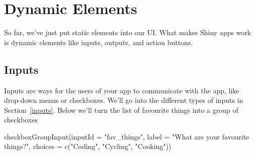 \documentclass[
  oneside]{book}
\newenvironment{Shaded}{\begin{snugshade}}{\end{snugshade}}
\newcommand{\AttributeTok}[1]{\textcolor[rgb]{0.77,0.63,0.00}{#1}}
\newcommand{\FunctionTok}[1]{\textcolor[rgb]{0.00,0.00,0.00}{#1}}
\newcommand{\NormalTok}[1]{#1}
\newcommand{\OtherTok}[1]{\textcolor[rgb]{0.56,0.35,0.01}{#1}}
\newcommand{\SpecialCharTok}[1]{\textcolor[rgb]{0.00,0.00,0.00}{#1}}
\newcommand{\StringTok}[1]{\textcolor[rgb]{0.31,0.60,0.02}{#1}}
\begin{document}
\begin{Shaded}
\end{Shaded}

\hypertarget{dynamic-elements}{%
\section{Dynamic Elements}\label{dynamic-elements}}

So far, we've just put static elements into our UI. What makes Shiny apps work is dynamic elements like inputs, outputs, and action buttons.

\hypertarget{inputs-intro}{%
\subsection{Inputs}\label{inputs-intro}}

Inputs are ways for the users of your app to communicate with the app, like drop-down menus or checkboxes. We'll go into the different types of inputs in Section~\ref{inputs}. Below we'll turn the list of favourite things into a group of checkboxes

\begin{Shaded}
\begin{Highlighting}[]
\FunctionTok{checkboxGroupInput}\NormalTok{(}\AttributeTok{inputId =} \StringTok{"fav\_things"}\NormalTok{, }\AttributeTok{label =} \StringTok{"What are your favourite things?"}\NormalTok{,}
    \AttributeTok{choices =} \FunctionTok{c}\NormalTok{(}\StringTok{"Coding"}\NormalTok{, }\StringTok{"Cycling"}\NormalTok{, }\StringTok{"Cooking"}\NormalTok{))}
\end{Highlighting}
\end{Shaded}
\end{document}
